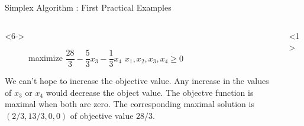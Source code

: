 \documentclass[32pt, aspectratio = 169]{beamer}
\begin{document}
\begin{frame}{Simplex Algorithm : First Practical Examples}
\begin{columns}
\begin{column}{.5\textwidth}
\begin{onlyenv}
{                }
            \end{onlyenv}
            \begin{onlyenv}<6->
                \begin{figure}
                \begin{linearProg}{
                        maximize
                        }{
                        $\dfrac{28}{3} - \dfrac{5}{3}x_3 - \dfrac{1}{3}x_4$
                        }{
                        }{
                        $x_1, x_2, x_3, x_4 \geq 0$
                        }
                \end{linearProg}
                \end{figure}
                \vspace{-1em}
                We can't hope to increase the objective value. Any increase in the values of $x_3$ or $x_4$ would decrease the object value. The objectve function is maximal when both are zero. The corresponding maximal solution is $(2/3, 13/3, 0, 0)$ of objective value $28/3$.
            \end{onlyenv}
        \end{column}
        \begin{column}{.5\textwidth}
            \begin{overlayarea}{\textwidth}{.8\textheight}
                \begin{onlyenv}<1>
                \begin{figure}
                \end{figure}

\end{onlyenv}
\end{overlayarea}
\end{column}
\end{columns}
\end{frame}
\end{document}
